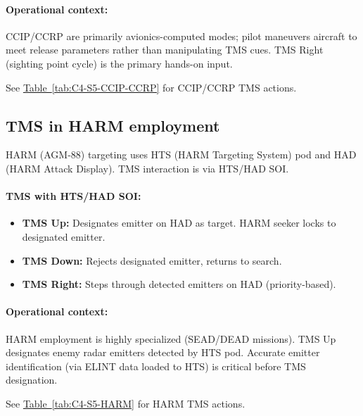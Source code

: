 \documentclass[11pt, a4paper, twoside]{report}
\newcommand{\tabref}[1]{\hyperref[#1]{Table~\ref*{#1}}}
\begin{document}
\paragraph{Operational context:}
CCIP/CCRP are primarily avionics-computed modes; pilot maneuvers aircraft to meet release parameters rather than manipulating TMS cues. TMS Right (sighting point cycle) is the primary hands-on input.

See \tabref{tab:C4-S5-CCIP-CCRP} for CCIP/CCRP TMS actions.

\subsection{TMS in HARM employment}
\label{sec:C4-S5-S5}

HARM (AGM-88) targeting uses HTS (HARM Targeting System) pod and HAD (HARM Attack Display). TMS interaction is via HTS/HAD SOI.

\paragraph{TMS with HTS/HAD SOI:}
\begin{itemize}
    \item \textbf{TMS Up:} Designates emitter on HAD as target. HARM seeker locks to designated emitter.
    \item \textbf{TMS Down:} Rejects designated emitter, returns to search.
    \item \textbf{TMS Right:} Steps through detected emitters on HAD (priority-based).
\end{itemize}

\paragraph{Operational context:}
HARM employment is highly specialized (SEAD/DEAD missions). TMS Up designates enemy radar emitters detected by HTS pod. Accurate emitter identification (via ELINT data loaded to HTS) is critical before TMS designation.

See \tabref{tab:C4-S5-HARM} for HARM TMS actions.

\end{document}
